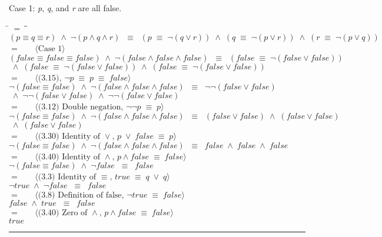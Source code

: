 \documentclass[12pt, fleqn, leqno]{article}
\newcommand{\lgap}{2pt}                             %
\newcommand{\mymathindent}{24pt}                    %
\newcommand{\equivs}{\ensuremath{\;\equiv\;}}       %
\newcommand{\equivss}{\ensuremath{\;\;\equiv\;\;}}  %
\newcommand{\lors}{\ensuremath{\;\lor\;}}           %
\newcommand{\lands}{\ensuremath{\;\land\;}}      %
\newcommand{\myqed}{\rule[-.23ex]{1.2ex}{2.0ex}}
\newcommand{\myqedtab}{\hspace{384pt}}              %
\newcommand{\Gll} {\langle}                         %
\newcommand{\Ggg} {\rangle}                         %
\newcommand{\Hint}[1]     {\ \ \ $\Gll              \mbox{#1} \Ggg$ }   %
\begin{document}
Case 1: \textit{p}, \textit{q}, and \textit{r} are all false.
\begin{tabbing}
\hspace{\mymathindent} \= $= \;$ \= \myqedtab \= \kill
	\> \>  $(p \equiv q \equiv r) \lands \lnot(p \land q \land r) \equivss (p \equivs \lnot(q \lor r)) \lands (q \equivs \lnot(p \lor r)) \lands (r \equivs \lnot(p \lor q))$\\
	\> $=$  \>  \Hint{Case 1}\\[\lgap]
	\> \>   $(false \equiv false \equiv false) \lands \lnot(false \land false \land false) \equivss (false \equivs \lnot(false \lor false))$\\
	\> \>   $\lands (false \equivs \lnot(false \lor false)) \lands (false \equivs \lnot(false \lor false))$\\
	\> $=$  \>  \Hint{(3.15), $\lnot p \equivs p \equivs false$}\\[\lgap]
	\> \>   $\lnot(false \equiv false) \lands \lnot(false \land false \land false) \equivss \lnot \lnot(false \lor false)$\\
	\> \>   $\lands \lnot \lnot(false \lor false) \lands \lnot \lnot(false \lor false)$\\
	\> $=$  \>  \Hint{(3.12) Double negation, $\lnot \lnot p \equivs p$}\\[\lgap]
	\> \>   $\lnot(false \equiv false) \lands \lnot(false \land false \land false) \equivss (false \lor false) \lands (false \lor false)$\\
	\> \>   $\lands (false \lor false)$\\
	\> $=$  \>  \Hint{(3.30) Identity of $\lor$, $p \lors false \equivs p$}\\[\lgap]
	\> \>   $\lnot(false \equiv false) \lands \lnot(false \land false \land false) \equivss false \lands false \lands false$\\
	\> $=$  \>  \Hint{(3.40) Identity of $\land$, $p \land false \equivs false$}\\[\lgap]
	\> \>   $\lnot(false \equiv false) \lands \lnot false \equivss false$\\
	\> $=$  \>  \Hint{(3.3) Identity of $\equiv$, $true \equivs q \lors q$}\\[\lgap]
	\> \>   $\lnot true \lands \lnot false\equivss false$\\
	\> $=$  \>  \Hint{(3.8) Definition of false, $\lnot true \equivs false$}\\[\lgap]
	\> \>   $false \lands true \equivss false$\\
	\> $=$  \>  \Hint{(3.40) Zero of $\land$, $p \land false \equivs false$}\\[\lgap]
	\> \>   $true$\quad \myqed\\
\end{tabbing}
\end{document}
